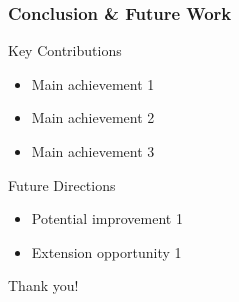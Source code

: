 \documentclass[
    9pt,
    aspectratio=169,
]{beamer}
\begin{document}
\begin{frame}
\frametitle{Conclusion \& Future Work}
\begin{block}{Key Contributions}
    \begin{itemize}
        \item Main achievement 1
        \item Main achievement 2
        \item Main achievement 3
    \end{itemize}
\end{block}

\begin{block}{Future Directions}
    \begin{itemize}
        \item Potential improvement 1
        \item Extension opportunity 1
    \end{itemize}
\end{block}

\begin{center}
\vspace{0.5cm}
\Large Thank you!
\end{center}
\end{frame}
\end{document}
